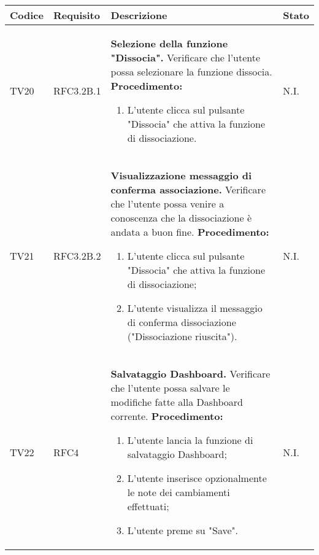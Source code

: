 \begin{table}[!htpb]
	\centering
	\renewcommand{\arraystretch}{2} 
	\begin{tabular}{|l|l|p{10cm}|l|}
		\rowcolor{orange!50}
		\hline
		\textbf{Codice} & \textbf{Requisito}& \textbf{Descrizione} & \textbf{Stato}\\ 
		\hline
		TV20 & RFC3.2B.1 &
			\textbf{Selezione della funzione "Dissocia".}
			\newline
			Verificare che l'utente possa selezionare la funzione dissocia.
			\newline
			\textbf{Procedimento:}
			\begin{enumerate}
				\item L’utente clicca sul pulsante "Dissocia" che attiva la funzione di dissociazione.
			\end{enumerate} 
			& N.I.\\
		\hline
		TV21 & RFC3.2B.2 &
			\textbf{Visualizzazione messaggio di conferma associazione.}
			\newline
			Verificare che l'utente possa venire a conoscenza che la dissociazione è andata a buon fine.
			\newline
			\textbf{Procedimento:}
			\begin{enumerate}
				\item L’utente clicca sul pulsante "Dissocia" che attiva la funzione di dissociazione;
				\item L’utente visualizza il messaggio di conferma dissociazione ("Dissociazione riuscita").
			\end{enumerate} 
			& N.I.\\
		\hline
		TV22 & RFC4 &
			\textbf{Salvataggio Dashboard.} 
			\newline
			Verificare che l’utente possa salvare le modifiche fatte alla Dashboard corrente. 
			\newline 
			\textbf{Procedimento:} 
			\begin{enumerate} 
				\item L'utente lancia la funzione di salvataggio Dashboard; 
				\item L'utente inserisce opzionalmente le note dei cambiamenti effettuati; 
				\item L'utente preme su "Save".		
			\end{enumerate} 
			& N.I.\\
		\hline
	\end{tabular}
\end{table}
